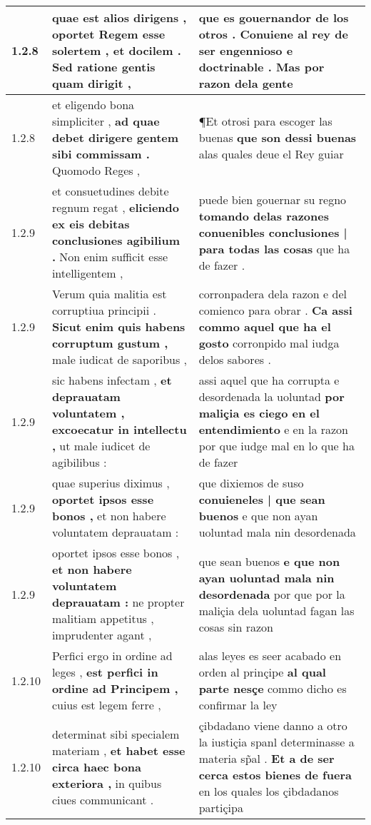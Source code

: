 \begin{tabular}{|p{1cm}|p{6.5cm}|p{6.5cm}|}
1.2.8 & quae est alios dirigens , \textbf{ oportet Regem esse solertem , et docilem . } Sed ratione gentis quam dirigit , & que es gouernandor de los otros . \textbf{ Conuiene al rey de ser engennioso e doctrinable . } Mas por razon dela gente \\\hline
1.2.8 & et eligendo bona simpliciter , \textbf{ ad quae debet dirigere gentem sibi commissam . } Quomodo Reges , & ¶Et otrosi para escoger las buenas \textbf{ que son dessi buenas } alas quales deue el Rey guiar \\\hline
1.2.9 & et consuetudines debite regnum regat , \textbf{ eliciendo ex eis debitas conclusiones agibilium . } Non enim sufficit esse intelligentem , & puede bien gouernar su regno \textbf{ tomando delas razones conuenibles conclusiones | para todas las cosas } que ha de fazer . \\\hline
1.2.9 & Verum quia malitia est corruptiua principii . \textbf{ Sicut enim quis habens corruptum gustum , } male iudicat de saporibus , & corronpadera dela razon e del comienco para obrar . \textbf{ Ca assi commo aquel que ha el gosto } corronpido mal iudga delos sabores . \\\hline
1.2.9 & sic habens infectam , \textbf{ et deprauatam voluntatem , excoecatur in intellectu , } ut male iudicet de agibilibus : & assi aquel que ha corrupta e desordenada la uoluntad \textbf{ por maliçia es ciego en el entendimiento } e en la razon por que iudge mal en lo que ha de fazer \\\hline
1.2.9 & quae superius diximus , \textbf{ oportet ipsos esse bonos , } et non habere voluntatem deprauatam : & que dixiemos de suso \textbf{ conuieneles | que sean buenos } e que non ayan uoluntad mala nin desordenada \\\hline
1.2.9 & oportet ipsos esse bonos , \textbf{ et non habere voluntatem deprauatam : } ne propter malitiam appetitus , imprudenter agant , & que sean buenos \textbf{ e que non ayan uoluntad mala nin desordenada } por que por la maliçia dela uoluntad fagan las cosas sin razon \\\hline
1.2.10 & Perfici ergo in ordine ad leges , \textbf{ est perfici in ordine ad Principem , } cuius est legem ferre , & alas leyes es seer acabado en orden al prinçipe \textbf{ al qual parte nesçe } commo dicho es confirmar la ley \\\hline
1.2.10 & determinat sibi specialem materiam , \textbf{ et habet esse circa haec bona exteriora , } in quibus ciues communicant . & çibdadano viene danno a otro la iustiçia spanl determinasse a materia sp̃al . \textbf{ Et a de ser cerca estos bienes de fuera } en los quales los çibdadanos partiçipa \\\hline

\end{tabular}
